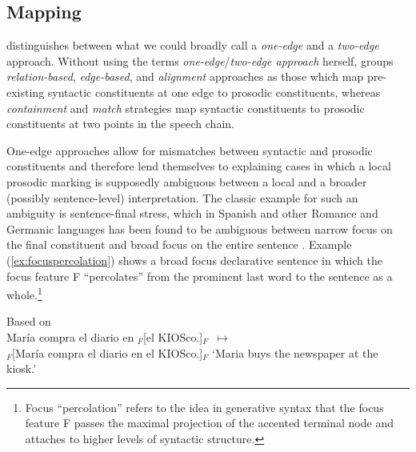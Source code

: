 \subsection{Mapping}\label{ch:2.2.1}\largerpage[2]

\citet[63]{Fery.2017} distinguishes between what we could broadly call a 
\textit{one-edge} and a \textit{two-edge} approach. Without using the terms 
\textit{one-edge}/\textit{two-edge approach} herself, \citet{Fery.2017} groups 
\textit{relation-based}, \textit{edge-based}, and \textit{alignment} approaches 
as those which map pre-existing syntactic constituents at one edge to 
prosodic constituents, whereas \textit{containment} and \textit{match} 
strategies map syntactic constituents to prosodic constituents at two 
points in the speech chain. 

One-edge approaches allow for mismatches between syntactic and prosodic constituents and therefore lend themselves to explaining cases in which a local prosodic marking is supposedly ambiguous between a local and a broader (possibly sentence-level) interpretation. The classic example for such an ambiguity is sentence-final stress, which in Spanish and other Romance and Germanic languages has been found to be ambiguous between narrow focus on the final constituent and broad focus on the entire sentence \citep[36]{Gabriel2007}. Example (\ref{ex:focuspercolation}) shows a broad focus declarative sentence in which the focus feature F “percolates” from the prominent last word to the sentence as a whole.{\footnote{Focus “percolation” refers to the idea in generative syntax that the focus feature F passes the maximal projection of the accented terminal node and attaches to higher levels of syntactic structure.}}

\begin{exe}
\ex\label{ex:focuspercolation} Based on \citet[65]{Gabriel2007} \\
 María compra el diario en $_{F}$[el KIOSco.]$_{F}$~$\longmapsto$\\
 $_{F}$[María compra el diario en el KIOSco.]$_{F}$ 
\glt `Maria buys the newspaper at the kiosk.’
\end{exe}



